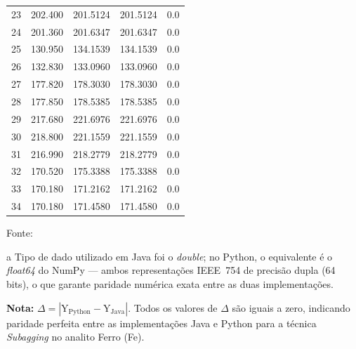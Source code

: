 \begin{table}[H]
\begin{threeparttable}
{\begin{tabular}{
    S[table-format=2.0]
    S[table-format=3.3]
    S[table-format=3.4]
    S[table-format=3.4]
    S[table-format=1.1]
}
23  & 202.400  & 201.5124  & 201.5124  & 0.0 \\
24  & 201.360  & 201.6347  & 201.6347  & 0.0 \\
25  & 130.950  & 134.1539  & 134.1539  & 0.0 \\
26  & 132.830  & 133.0960  & 133.0960  & 0.0 \\
27  & 177.820  & 178.3030  & 178.3030  & 0.0 \\
28  & 177.850  & 178.5385  & 178.5385  & 0.0 \\
29  & 217.680  & 221.6976  & 221.6976  & 0.0 \\
30  & 218.800  & 221.1559  & 221.1559  & 0.0 \\
31  & 216.990  & 218.2779  & 218.2779  & 0.0 \\
32  & 170.520  & 175.3388  & 175.3388  & 0.0 \\
33  & 170.180  & 171.2162  & 171.2162  & 0.0 \\
34  & 170.180  & 171.4580  & 171.4580  & 0.0 \\
\bottomrule
\end{tabular}%
}
\begin{center}
\begin{minipage}{0.85\linewidth}
\begin{tablenotes}
\footnotesize
\item Fonte:~\oautor
\item[a] Tipo de dado utilizado em Java foi o \textit{double}; no Python,
o equivalente é o \textit{float64} do NumPy — ambos representações IEEE~754
de precisão dupla (64 bits), o que garante paridade numérica exata entre as
duas implementações.
\item \textbf{Nota:} $\Delta = |\text{Y}_{\text{Python}} - \text{Y}_{\text{Java}}|$.
Todos os valores de $\Delta$ são iguais a zero, indicando paridade
perfeita entre as implementações Java e Python para a técnica \textit{Subagging}
no analito Ferro (Fe).
\end{tablenotes}
\end{minipage}
\end{center}
\end{threeparttable}
\end{table}

